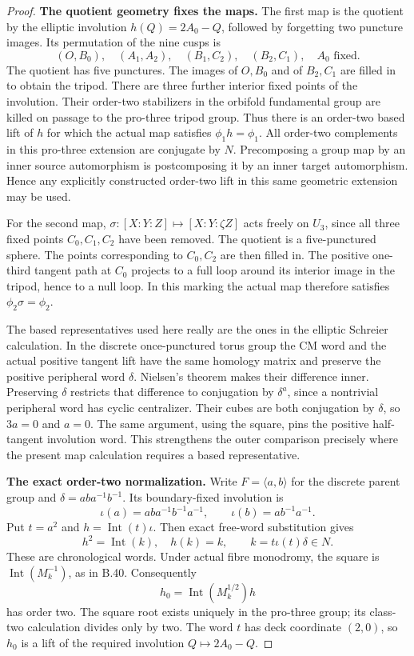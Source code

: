 \begin{proof}
\par\smallskip\noindent\textbf{The quotient geometry fixes the maps.}
The first map is the quotient by the elliptic involution
$h(Q)=2A_0-Q$, followed by forgetting two puncture images.
Its permutation of the nine cusps is
\[
 (O,B_0),\quad(A_1,A_2),\quad(B_1,C_2),\quad(B_2,C_1),
 \quad A_0\text{ fixed}.
\]
The quotient has five punctures.  The images of $O,B_0$ and
of $B_2,C_1$ are filled in to obtain the tripod.
There are three further interior fixed points of the involution.
Their order-two stabilizers in the orbifold fundamental group
are killed on passage to the pro-three tripod group.  Thus there
is an order-two based lift of $h$ for which the actual map satisfies
$\phi_1h=\phi_1$.  All order-two complements in this pro-three
extension are conjugate by $N$.  Precomposing a group map by an
inner source automorphism is postcomposing it by an inner target
automorphism.  Hence any explicitly constructed order-two lift
in this same geometric extension may be used.

For the second map, $\sigma:[X:Y:Z]\mapsto[X:Y:\zeta Z]$
acts freely on $U_3$, since all three fixed points $C_0,C_1,C_2$
have been removed.  The quotient is a five-punctured sphere.
The points corresponding to $C_0,C_2$ are then filled in.
The positive one-third tangent path at $C_0$ projects to a full
loop around its interior image in the tripod, hence to a null
loop.  In this marking the actual map therefore satisfies
$\phi_2\sigma=\phi_2$.

The based representatives used here really are the ones in the
elliptic Schreier calculation.  In the discrete once-punctured
torus group the CM word and the actual positive tangent lift have
the same homology matrix and preserve the positive peripheral
word $\delta$.  Nielsen's theorem makes their difference inner.
Preserving $\delta$ restricts that difference to conjugation by
$\delta^a$, since a nontrivial peripheral word has cyclic
centralizer.  Their cubes are both conjugation by $\delta$,
so $3a=0$ and $a=0$.  The same argument, using the square, pins
the positive half-tangent involution word.  This strengthens the
outer comparison precisely where the present map calculation
requires a based representative.

\par\smallskip\noindent\textbf{The exact order-two normalization.}
Write $F=\langle a,b\rangle$ for the discrete parent group and
$\delta=aba^{-1}b^{-1}$.  Its boundary-fixed involution is
\[
 \iota(a)=aba^{-1}b^{-1}a^{-1},\qquad
 \iota(b)=ab^{-1}a^{-1}.
\]
Put $t=a^2$ and $h=\operatorname{Int}(t)\iota$.
Then exact free-word substitution gives
\[
 h^2=\operatorname{Int}(k),\quad h(k)=k,
 \qquad k=t\iota(t)\delta\in N.                            \tag{B.44.3}
\]
These are chronological words.  Under actual fibre monodromy,
the square is $\operatorname{Int}(M_k^{-1})$, as in B.40.
Consequently
\[
 h_0=\operatorname{Int}(M_k^{1/2})h                         \tag{B.44.4}
\]
has order two.  The square root exists uniquely in the pro-three
group; its class-two calculation divides only by two.  The word
$t$ has deck coordinate $(2,0)$, so $h_0$ is a lift of the
required involution $Q\mapsto2A_0-Q$.


\end{proof}
